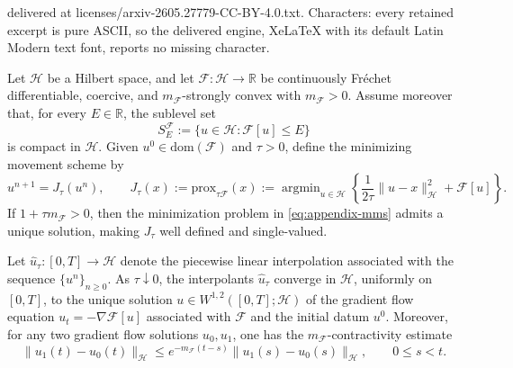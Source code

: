 \documentclass[10pt,a4paper]{amsart}
\newcommand{\argmin}{\mathop{\mathrm{arg min}}}
\newcommand{\calF}{\mathcal{F}}
\newcommand{\calH}{\mathcal{H}}
\newcommand{\prox}{\mathrm{prox}}
\begin{document}
delivered at licenses/arxiv-2605.27779-CC-BY-4.0.txt. Characters: every retained excerpt is pure ASCII, so the delivered engine, XeLaTeX with its default Latin Modern text font, reports no missing character.
\begin{theorem}\label{thm:mms-convergence}
Let $\calH$ be a Hilbert space, and let $\calF:\calH\to\mathbb{R}$ be continuously Fr\'echet differentiable, coercive, and $m_{\calF}$-strongly convex with $m_\calF>0$. Assume moreover that, for every $E\in\mathbb{R}$, the sublevel set
\[
S_E^{\calF}:=\{u\in\calH:\calF[u]\le E\}
\]
is compact in $\calH$. Given $u^0\in \mathrm{dom}(\calF)$ and $\tau>0$, define the minimizing movement scheme by
\begin{equation}\label{eq:appendix-mms}
u^{n+1}=J_\tau(u^n),
\qquad
J_\tau(x):=\prox_{\tau\calF}(x)
:=\argmin_{u\in\calH}
\left\{
\frac{1}{2\tau}\|u-x\|_{\calH}^2+\calF[u]
\right\}.
\end{equation}
If $1+\tau m_{\calF}>0$, then the minimization problem in \eqref{eq:appendix-mms} admits a unique solution, making $J_\tau$ well defined and single-valued.

Let $\hat u_\tau:[0,T]\to\calH$ denote the piecewise linear interpolation associated with the sequence $\{u^n\}_{n\ge0}$. As $\tau\downarrow0$, the interpolants $\hat u_\tau$ converge in $\calH$, uniformly on $[0,T]$, to the unique solution
\(
u\in W^{1,2}([0,T];\calH) 
\)
of the gradient flow equation $u_t = - \nabla \calF[u]$ associated with $\calF$ and the initial datum $u^0$. Moreover, for any two gradient flow solutions $u_0,u_1$, one has the $m_{\calF}$-contractivity estimate
\begin{equation*}
\|u_1(t)-u_0(t)\|_{\calH}
\le
e^{-m_{\calF}(t-s)}
\|u_1(s)-u_0(s)\|_{\calH},
\qquad 0\le s<t.
\end{equation*}
\end{theorem}
\end{document}
